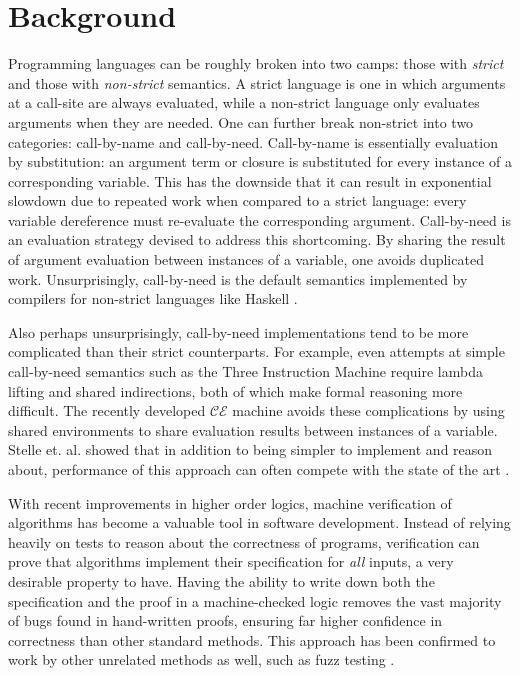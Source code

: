 \section{Background}

Programming languages can be roughly broken into two camps: those with
\emph{strict} and those with \emph{non-strict} semantics. A strict language is
one in which arguments at a call-site are always evaluated, while a non-strict
language only evaluates arguments when they are needed. One can further break
non-strict into two categories: call-by-name and call-by-need. Call-by-name is
essentially evaluation by substitution: an argument term or closure is
substituted for every instance of a corresponding variable. This has the
downside that it can result in exponential slowdown due to repeated work when
compared to a strict language: every variable dereference must re-evaluate the
corresponding argument. Call-by-need is an evaluation strategy devised to
address this shortcoming. By sharing the result of argument evaluation between
instances of a variable, one avoids duplicated work.  Unsurprisingly,
call-by-need is the default semantics implemented by compilers for non-strict
languages like Haskell \cite{stg}. 

Also perhaps unsurprisingly, call-by-need implementations tend to be more
complicated than their strict counterparts. For example, even attempts at simple
call-by-need semantics such as the Three Instruction Machine require lambda
lifting and shared indirections, both of which make formal reasoning more
difficult. The recently developed $\mathcal{CE}$ machine avoids these
complications by using shared environments to share evaluation results between
instances of a variable. Stelle et. al. showed that in addition to being simpler
to implement and reason about, performance of this approach can often compete
with the state of the art \cite{cem}. 

With recent improvements in higher order logics, machine verification of
algorithms has become a valuable tool in software development. Instead of
relying heavily on tests to reason about the correctness of programs,
verification can prove that algorithms implement their specification for
\emph{all} inputs, a very desirable property to have. Having the ability to
write down both the specification and the proof in a machine-checked logic
removes the vast majority of bugs found in hand-written proofs, ensuring far
higher confidence in correctness than other standard methods. This approach has
been confirmed to work by other unrelated methods as well, such as fuzz testing
\cite{fuzz}.

